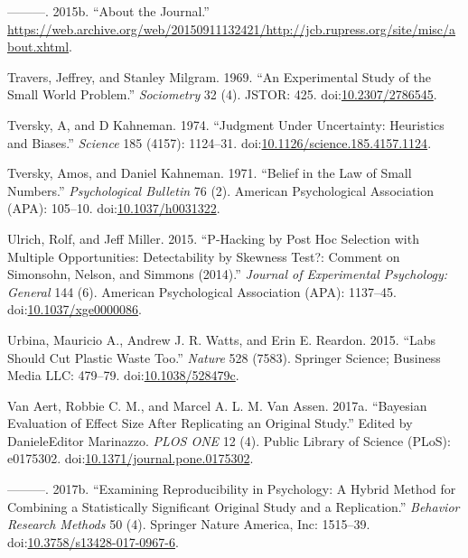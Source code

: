 \documentclass[a5paper]{book}
\begin{document}
\hypertarget{ref-The_Journal_of_Cell_Biology2015-vh}{}
---------. 2015b. ``About the Journal.''
\url{https://web.archive.org/web/20150911132421/http://jcb.rupress.org/site/misc/about.xhtml}.

\hypertarget{ref-doi:10.2307ux2f2786545}{}
Travers, Jeffrey, and Stanley Milgram. 1969. ``An Experimental Study of
the Small World Problem.'' \emph{Sociometry} 32 (4). JSTOR: 425.
doi:\href{https://doi.org/10.2307/2786545}{10.2307/2786545}.

\hypertarget{ref-doi:10.1126ux2fscience.185.4157.1124}{}
Tversky, A, and D Kahneman. 1974. ``Judgment Under Uncertainty:
Heuristics and Biases.'' \emph{Science} 185 (4157): 1124--31.
doi:\href{https://doi.org/10.1126/science.185.4157.1124}{10.1126/science.185.4157.1124}.

\hypertarget{ref-doi:10.1037ux2fh0031322}{}
Tversky, Amos, and Daniel Kahneman. 1971. ``Belief in the Law of Small
Numbers.'' \emph{Psychological Bulletin} 76 (2). American Psychological
Association (APA): 105--10.
doi:\href{https://doi.org/10.1037/h0031322}{10.1037/h0031322}.

\hypertarget{ref-doi:10.1037ux2fxge0000086}{}
Ulrich, Rolf, and Jeff Miller. 2015. ``P-Hacking by Post Hoc Selection
with Multiple Opportunities: Detectability by Skewness Test?: Comment on
Simonsohn, Nelson, and Simmons (2014).'' \emph{Journal of Experimental
Psychology: General} 144 (6). American Psychological Association (APA):
1137--45.
doi:\href{https://doi.org/10.1037/xge0000086}{10.1037/xge0000086}.

\hypertarget{ref-doi:10.1038ux2f528479c}{}
Urbina, Mauricio A., Andrew J. R. Watts, and Erin E. Reardon. 2015.
``Labs Should Cut Plastic Waste Too.'' \emph{Nature} 528 (7583).
Springer Science; Business Media LLC: 479--79.
doi:\href{https://doi.org/10.1038/528479c}{10.1038/528479c}.

\hypertarget{ref-doi:10.1371ux2fjournal.pone.0175302}{}
Van Aert, Robbie C. M., and Marcel A. L. M. Van Assen. 2017a. ``Bayesian
Evaluation of Effect Size After Replicating an Original Study.'' Edited
by DanieleEditor Marinazzo. \emph{PLOS ONE} 12 (4). Public Library of
Science (PLoS): e0175302.
doi:\href{https://doi.org/10.1371/journal.pone.0175302}{10.1371/journal.pone.0175302}.

\hypertarget{ref-doi:10.3758ux2fs13428-017-0967-6}{}
---------. 2017b. ``Examining Reproducibility in Psychology: A Hybrid
Method for Combining a Statistically Significant Original Study and a
Replication.'' \emph{Behavior Research Methods} 50 (4). Springer Nature
America, Inc: 1515--39.
doi:\href{https://doi.org/10.3758/s13428-017-0967-6}{10.3758/s13428-017-0967-6}.
\end{document}
